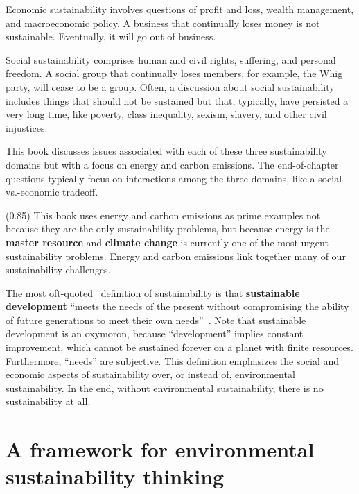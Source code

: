 \documentclass{article}\usepackage[]{graphicx}\usepackage[table]{xcolor}
\begin{document}
Economic sustainability
involves questions of profit and loss, wealth management, and
macroeconomic policy.
A business that continually loses money is not sustainable.
Eventually, it will go out of business.

Social sustainability comprises human and 
civil rights,
suffering, and personal freedom.
A social group that continually loses members, for example, the Whig party, will
cease to be a group.
Often, a discussion about social sustainability 
includes things that should not be sustained but that, typically, 
have persisted a very long time, 
like poverty, class inequality, sexism, slavery, and other civil injustices.

This book discusses issues associated with each of these three
sustainability domains but with a focus on energy and carbon emissions.
The end-of-chapter questions typically focus on interactions among the three
domains, like a social-vs.-economic tradeoff.

\begin{mcframe}[0.90\textwidth](0.85\textwidth)
This book uses energy and carbon emissions as prime examples not
because they are the only sustainability problems, but because
energy is the \textbf{master resource} and \textbf{climate change}
is currently one of the most urgent sustainability problems.
Energy and carbon emissions
link together many of our sustainability challenges.
\end{mcframe}

The most oft-quoted~\cite{Quental2011} definition of sustainability is that
\textbf{sustainable development} ``meets the needs of the present without
compromising the ability of future generations to meet their own needs''~\cite{Brundtland}.
Note that sustainable development is an oxymoron, %
because ``development'' implies constant improvement, which cannot be sustained
forever on a planet with finite resources.
Furthermore, ``needs'' are subjective.
This definition emphasizes the social and
economic aspects of sustainability over,
or instead of, environmental sustainability.
In the end, without environmental sustainability,
there is no sustainability at all.


\section{A framework for environmental sustainability thinking}
\end{document}
